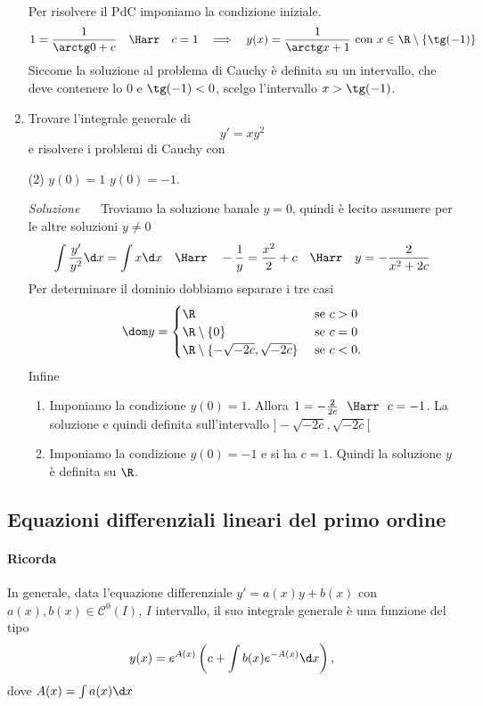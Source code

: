 \documentclass{article}
\newcommand{\se}{\text{ se }}
\begin{document}
\begin{enumerate}[label=\textbf{Esercizio 13.\arabic*.},itemindent=*]
Per risolvere il PdC imponiamo la condizione iniziale.
\[1=\frac{1}{\arctg 0 +c}~~~\Harr~~~c=1~~\implies~~y(x)=\frac{1}{\arctg x +1} \text{ con }x\in \R\setminus \{\tg (-1)\}\]
Siccome la soluzione al problema di Cauchy è definita su un intervallo, che deve contenere lo $0$ e $\tg (-1)<0$, scelgo l'intervallo $x>\tg(-1)$.
\item Trovare l'integrale generale di 
\[
    y'=xy^2
\]
e risolvere i problemi di Cauchy con
\begin{tasks}(2)
    \task $y(0)=1$ \task $y(0)=-1$.
\end{tasks}
\item[\textit{\large Soluzione~}]~ Troviamo la soluzione banale $y=0$, quindi è lecito assumere per le altre soluzioni $y\neq 0$
\[\int \frac{y'}{y^2}\d x=\int x \d x~~~\Harr~~~-\frac{1}{y}=\frac{x^2}{2}+c~~~\Harr~~~y=-\frac{2}{x^2+2c}\]
Per determinare il dominio dobbiamo separare i tre casi
\[\dom y=\begin{cases}
    \R &\se c>0\\
    \R\setminus \{0\}&\se c=0\\
    \R\setminus \{-\sqrt{-2c}, \sqrt{-2c}\}&\se c< 0.
\end{cases}\]
Infine
\begin{enumerate}
    \item Imponiamo la condizione $y(0)=1$. Allora $1=-\frac{2}{2c}~~\Harr~~c=-1$. La soluzione e quindi definita sull'intervallo $]-\sqrt{-2c}, \sqrt{-2c}[$
    \item Imponiamo la condizione $y(0)=-1$ e si ha $c=1$. Quindi la soluzione $y$ è definita su $\R$.
\end{enumerate}
\end{enumerate}
\vspace{1cm}
\subsection*{Equazioni differenziali lineari del primo ordine}

\begin{lineframe}
    \paragraph*{Ricorda} In generale, data l'equazione differenziale $y'=a(x)y+b(x)$ con $a(x),b(x)\in \mathcal{C}^0(I)$, $I$ intervallo, il suo integrale generale è una funzione del tipo 
    \[y(x)=e^{A(x)}\left( c+\int b(x)e^{-A(x)}\d x \right),\]
    dove $A(x)=\int a(x)\d x$
\end{lineframe}
\end{document}
